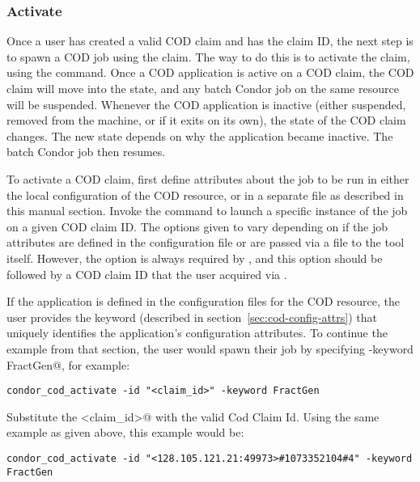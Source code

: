 \subsubsection{\label{sec:cod-claim-activate}Activate}

Once a user has created a valid COD claim and has the claim ID, the
next step is to spawn a COD job using the claim.
The way to do this is to activate the claim, using the
 command.
Once a COD application is active on a COD claim, the COD claim will
move into the \verb@Running@ state, and any batch Condor job
on the same resource will be suspended.
Whenever the COD application is inactive (either suspended, removed
from the machine, or if it exits on its own), the state of the COD
claim changes. The new state depends on why the application
became inactive. 
The batch Condor job then resumes.

To activate a COD claim, first define attributes about
the job to be run in either the local configuration of the COD
resource, or in a separate file as described in this manual section.
Invoke the
 command to launch a specific instance of the
job on a given COD claim ID.
The options given to  vary depending on if the
job attributes are defined in the configuration file or are
passed via a file to the  tool itself.
However, the  option is always required by
, and this option should be followed
by a COD claim ID that
the user acquired via .


If the application is defined in the configuration files for the COD
resource, the user provides the keyword (described in
section~\ref{sec:cod-config-attrs}) that uniquely identifies the
application's configuration attributes.
To continue the example from that section, the user would spawn their
job by specifying \verb@-keyword FractGen@, for example:
\begin{verbatim}
condor_cod_activate -id "<claim_id>" -keyword FractGen
\end{verbatim}
Substitute the \verb@<claim_id>@ with the valid Cod Claim Id.
Using the same example as given above, this example would be:
\footnotesize
\begin{verbatim}
condor_cod_activate -id "<128.105.121.21:49973>#1073352104#4" -keyword FractGen
\end{verbatim}
\normalsize

